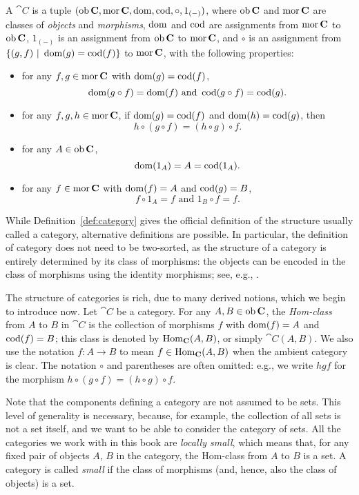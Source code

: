 \begin{definition}\label{def:category}
A  $\cat{C}$ is a tuple $(\operatorname{\mathrm{ob}} \mathbf{C}, \operatorname{\mathrm{mor}} \mathbf{C}, \operatorname{\mathrm{dom}}, \operatorname{\mathrm{cod}}, \circ, 1_{(-)})$, where $\operatorname{\mathrm{ob}} \mathbf{C}$ and $\operatorname{\mathrm{mor}} \mathbf{C}$ are classes of \emph{objects} and \emph{morphisms}, $\operatorname{\mathrm{dom}}$ and $\operatorname{\mathrm{cod}}$ are assignments from $\operatorname{\mathrm{mor}} \mathbf{C}$ to $\operatorname{\mathrm{ob}} \mathbf{C}$, $1_{(-)}$ is an assignment from $\operatorname{\mathrm{ob}} \mathbf{C}$ to $\operatorname{\mathrm{mor}} \mathbf{C}$, and $\circ$ is an assignment from $\{(g,f) \ | \  \operatorname{\mathrm{dom}}(g) = \operatorname{\mathrm{cod}}(f)\}$ to $\operatorname{\mathrm{mor}} \mathbf{C}$, with the following properties:
\begin{itemize}
	\item for any $f,g \in \operatorname{\mathrm{mor}} \mathbf{C}$ with $\operatorname{\mathrm{dom}}(g) = \operatorname{\mathrm{cod}}(f)$,  
	\[\operatorname{\mathrm{dom}}(g \circ f) = \operatorname{\mathrm{dom}}(f) \text{ and } \operatorname{\mathrm{cod}}(g \circ f) = \operatorname{\mathrm{cod}}(g).\]
	\item for any $f, g, h \in \operatorname{\mathrm{mor}} \mathbf{C}$, if $\operatorname{\mathrm{dom}}(g) = \operatorname{\mathrm{cod}}(f)$ and $\operatorname{\mathrm{dom}}(h) = \operatorname{\mathrm{cod}}(g)$, then 
	\[h \circ (g \circ f) = (h \circ g) \circ f.\]
	\item for any $A \in \operatorname{\mathrm{ob}} \mathbf{C}$, 
	\[\operatorname{\mathrm{dom}}(1_A) = A = \operatorname{\mathrm{cod}}(1_A).\]
	\item for any $f \in \operatorname{\mathrm{mor}} \mathbf{C}$ with $\operatorname{\mathrm{dom}}(f) = A$ and $\operatorname{\mathrm{cod}}(g) = B$,
	\[ f \circ 1_A = f \text{ and } 1_B \circ f = f.\]
\end{itemize}
\end{definition}


While Definition~\ref{def:category} gives the official definition of the structure usually called a category, alternative definitions are possible. In particular, the definition of category does not need to be two-sorted, as the structure of a category is entirely determined by its class of morphisms: the objects can be encoded in the class of morphisms using the identity morphisms; see, e.g., \cite[Def.~3.53, p.~42]{AdaHerStr1990}.

The structure of categories is rich, due to many derived notions, which we begin to introduce now. Let $\cat{C}$ be a category. For any $A, B \in \operatorname{\mathrm{ob}} \mathbf{C}$, the \emph{Hom-class} from $A$ to $B$ in $\cat{C}$ is the collection of morphisms $f$ with $\operatorname{\mathrm{dom}}(f) = A$ and $\operatorname{\mathrm{cod}}(f) = B$; this class is denoted by $\mathrm{Hom}_{\mathbf{C}}(A,B)$, or simply $\cat{C}(A,B)$. We also use the notation $f \colon A \to B$ to mean $f \in \mathrm{Hom}_{\mathbf{C}}(A,B)$ when the ambient category is clear. The notation $\circ$ and parentheses are often omitted: e.g., we write $hgf$ for the morphism $h \circ (g \circ f) = (h \circ g) \circ f$.

Note that the components defining a category are not assumed to be sets. This level of generality is necessary, because, for example, the collection of all sets is not a set itself, and we want to be able to consider the category of sets. All the categories we work with in this book are \emph{locally small}, which means that, for any fixed pair of objects $A$, $B$ in the category, the Hom-class from $A$ to $B$ is a set. A category is called \emph{small} if the class of morphisms (and, hence, also the class of objects) is a set.



